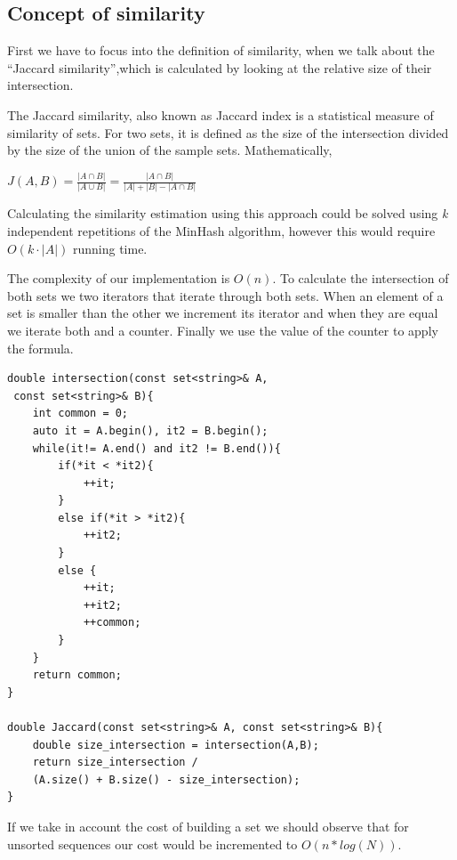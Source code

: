 \documentclass[12pt]{article}
\begin{document}
\subsection{Concept of similarity}
First we have to focus into the definition of similarity, when we talk about the ``Jaccard similarity'',which is calculated by looking at the relative size of their intersection. 

The Jaccard similarity, also known as Jaccard index is a statistical measure of similarity of sets. For two sets, it is defined as the size of the intersection divided by the size of the union of the sample sets. Mathematically,
\bigbreak
\centerline{\large $J(A,B)=\frac{\left |A\cap B  \right |}{ \left |A\cup B  \right |} = \frac{\left |A\cap B  \right |}{ \left|A\right|+\left|B\right|-\left |A\cap B  \right |} $}
\bigbreak

Calculating the similarity estimation using this approach could be solved using \textit{k} independent repetitions of the MinHash algorithm, however this would require $O(k \cdot |A|)$ running time. 

The complexity of our implementation is $O(n)$. To calculate the intersection of both sets we two iterators that iterate through both sets. When an element of a set is smaller than the other we increment its iterator and when they are equal we iterate both and a counter. Finally we use the value of the counter to apply the formula. 
\lstset{language= C++}
\begin{lstlisting}
double intersection(const set<string>& A,
 const set<string>& B){
	int common = 0; 
	auto it = A.begin(), it2 = B.begin();
	while(it!= A.end() and it2 != B.end()){
		if(*it < *it2){
			++it;
		}
		else if(*it > *it2){
			++it2;
		}
		else {
			++it;
			++it2;
			++common;
		}
	}
	return common; 
}

double Jaccard(const set<string>& A, const set<string>& B){
	double size_intersection = intersection(A,B);
	return size_intersection / 
	(A.size() + B.size() - size_intersection);
}

\end{lstlisting}

If we take in account the cost of building a set we should observe that for unsorted sequences our cost would be incremented to $O(n*log(N))$.


\end{document}
